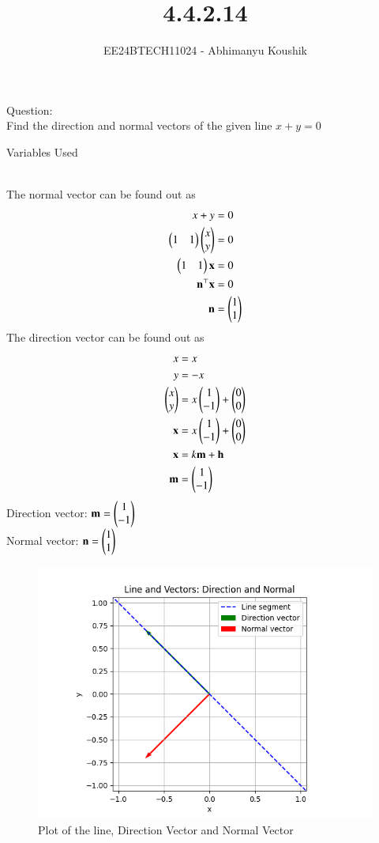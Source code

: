 \documentclass[journal]{IEEEtran}
\begin{document}

\vspace{3cm}

\title{4.4.2.14}
\author{EE24BTECH11024 - Abhimanyu Koushik}
{\let\newpage\relax\maketitle}
Question:\\
Find the direction and normal vectors of the given line $x+y=0$
\begin{table}[h!]    
  \centering
  
  \caption{Variables Used}
  \label{tab1-1.9-6}
\end{table}\\
\solution
The normal vector can be found out as
\begin{align}
x+y&=0\\
\begin{pmatrix}1 & 1\end{pmatrix}\begin{pmatrix}x\\y\end{pmatrix}&=0\\
\begin{pmatrix}1&1\end{pmatrix}\mathbf{x}&=0\\
\mathbf{n}^\top\mathbf{x}&=0\\
\mathbf{n}&=\begin{pmatrix}1\\1\end{pmatrix}
\end{align}
The direction vector can be found out as
\begin{align}
x&=x\\
y&=-x\\
\begin{pmatrix}x\\y\end{pmatrix}&=x\begin{pmatrix}1\\-1\end{pmatrix}+\begin{pmatrix}0\\0\end{pmatrix}\\
\mathbf{x}&=x\begin{pmatrix}1\\-1\end{pmatrix}+\begin{pmatrix}0\\0\end{pmatrix}\\
\mathbf{x}&=k\mathbf{m}+\mathbf{h}\\
\mathbf{m}&=\begin{pmatrix}1\\-1\end{pmatrix}
\end{align}
Direction vector: $\mathbf{m}=\begin{pmatrix}1\\-1\end{pmatrix}$\\
Normal vector: $\mathbf{n}=\begin{pmatrix}1\\1\end{pmatrix}$
\begin{figure}[h!]
   \centering
   \includegraphics[width = 1\linewidth]{figs/fig.png}
   \caption{Plot of the line, Direction Vector and Normal Vector}
   \label{stemplot}
\end{figure}
\end{document}
